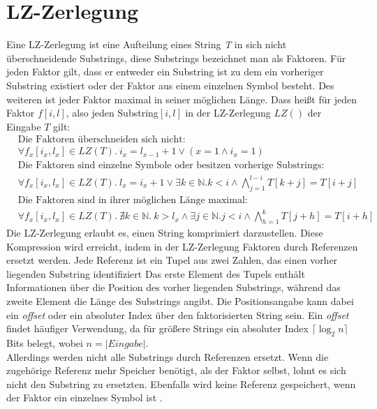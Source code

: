 \section{LZ-Zerlegung}
Eine LZ-Zerlegung ist eine Aufteilung eines String \textit{T} in sich nicht überschneidende Substrings, diese Substrings  bezeichnet man als Faktoren.
Für jeden Faktor gilt, dass er  entweder ein Substring  ist zu dem ein vorheriger Substring  existiert oder der Faktor aus einem einzelnen Symbol besteht.
Des weiteren ist jeder Faktor maximal in seiner möglichen Länge.
Dass heißt für jeden Faktor $f[i,l]$, also jeden Substring$[i,l]$ in der LZ-Zerlegung $LZ()$ der Eingabe $T$ gilt:
\begin{align}
\nonumber
&\text{Die Faktoren überschneiden sich nicht:}\\
&\forall f_{x}[i_{x},l_{x}] \in LZ(T). \ i_{x}= l_{x-1} + 1 \lor ( x=1 \land i_{x}=1 )\\\nonumber
&\text{Die Faktoren sind einzelne Symbole oder besitzen vorherige Substrings:}\\
&\forall f_{x}[i_{x},l_{x}] \in LZ(T). \ l_{x} = i_{x}+1 \lor \exists k \in  \mathbb{N}. k<i  \land \bigwedge_{j=1}^{l-i} T[k+j]=T[i+j] \\\nonumber
&\text{Die Faktoren sind in ihrer möglichen Länge maximal:}\\ 
&\forall f_{x}[i_{x},l_{x}] \in LZ(T). \  \nexists k \in \mathbb{N}. \ {} k > l_{x} \land \exists j \in  \mathbb{N}. j < i  \land \bigwedge_{h=1}^{k} T[j+h]=T[i+h]
\end{align}
Die LZ-Zerlegung erlaubt es, einen String  komprimiert darzustellen.
Diese Kompression wird erreicht, indem in der LZ-Zerlegung Faktoren durch Referenzen ersetzt werden.
Jede Referenz ist ein Tupel aus zwei Zahlen, das  einen vorher liegenden Substring  identifiziert
Das erste Element des Tupels enthält Informationen über die Position des vorher liegenden Substrings, während das zweite Element die Länge des Substrings angibt.
Die Positionsangabe kann dabei ein \textit{offset} oder ein absoluter Index über den faktorisierten  String  sein.
Ein \textit{offset} findet häufiger Verwendung, da für größere Strings  ein absoluter Index $\lceil \log_2{n}\rceil$ Bits belegt, wobei $n = |Eingabe|$.\\
Allerdings werden nicht alle Substrings  durch Referenzen ersetzt.
Wenn die zugehörige Referenz mehr Speicher benötigt, als der Faktor selbst, lohnt es sich nicht den Substring  zu ersetzten.
Ebenfalls wird keine Referenz gespeichert, wenn der Faktor ein einzelnes Symbol ist \cite{LZ77}.
\newpage
